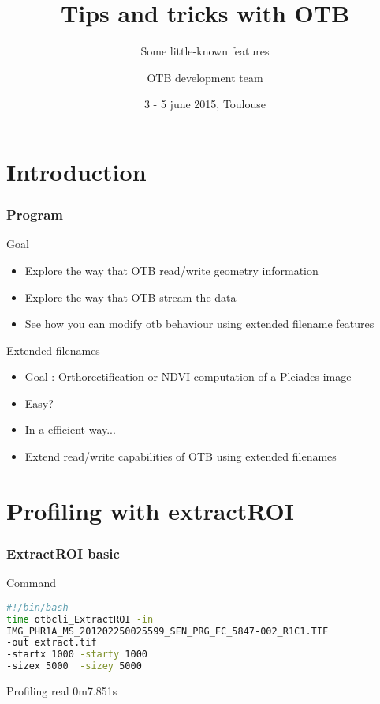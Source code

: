\documentclass[8pt]{beamer}
\title{Tips and tricks with OTB}
\subtitle{Some little-known features}
\author{OTB development team}%
\date{3 - 5 june 2015, Toulouse}
\begin{document}
\begin{frame}
\titlepage
\end{frame}

\section{Introduction}
\begin{frame}
\frametitle{Program}
\begin{block}{Goal}
\begin{itemize}
\item Explore the way that OTB read/write geometry information
\item Explore the way that OTB stream the data
\item See how you can modify otb behaviour using extended filename features
\end{itemize}
\end{block}

\begin{block}{Extended filenames}
\begin{itemize}
\item Goal : Orthorectification or NDVI computation  of a Pleiades image
\item Easy?
\item In a efficient way...
\item Extend read/write capabilities of OTB using extended filenames
\end{itemize}
\end{block}

\end{frame}

\section{Profiling with extractROI}

\begin{frame}[fragile]
\frametitle{ExtractROI basic}

\begin{block}{Command}
\begin{lstlisting}[language=bash]
#!/bin/bash
time otbcli_ExtractROI -in
IMG_PHR1A_MS_201202250025599_SEN_PRG_FC_5847-002_R1C1.TIF 
-out extract.tif 
-startx 1000 -starty 1000 
-sizex 5000  -sizey 5000 
\end{lstlisting}
\end{block}

\begin{block}{Profiling}
real	0m7.851s
\end{block}

\end{frame}
\end{document}
